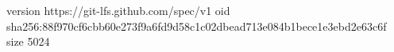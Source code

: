 version https://git-lfs.github.com/spec/v1
oid sha256:88f970cf6cbb60e273f9a6fd9d58c1c02dbead713e084b1bece1e3ebd2e63c6f
size 5024
